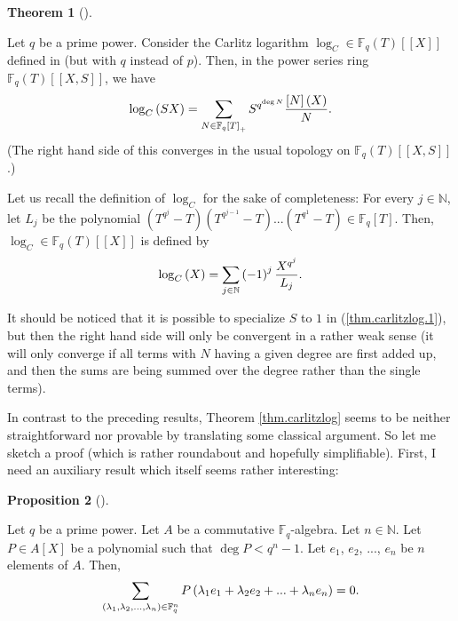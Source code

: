 \documentclass[numbers=enddot,12pt,final,onecolumn,notitlepage]{scrartcl}%
\theoremstyle{definition}
\newtheorem{theo}{Theorem}[section]
\newenvironment{theorem}[1][]
{\begin{theo}[#1]\begin{leftbar}}
{\end{leftbar}\end{theo}}
\newtheorem{prop}[theo]{Proposition}
\newenvironment{proposition}[1][]
{\begin{prop}[#1]\begin{leftbar}}
{\end{leftbar}\end{prop}}
\let\sumnonlimits\sum
\renewcommand{\sum}{\sumnonlimits\limits}
\begin{document}
\begin{theorem}
\label{thm.carlitzlog}Let $q$ be a prime power. Consider the Carlitz logarithm
$\log_{C}\in\mathbb{F}_{q}\left(  T\right)  \left[  \left[  X\right]  \right]
$ defined in \cite[Section 8]{kc-carlitz} (but with $q$ instead of $p$). Then,
in the power series ring $\mathbb{F}_{q}\left(  T\right)  \left[  \left[
X,S\right]  \right]  $, we have%
\begin{equation}
\log_{C}\left(  SX\right)  =\sum\limits_{N\in\mathbb{F}_{q}\left[  T\right]
_{+}}S^{q^{\deg N}}\dfrac{\left[  N\right]  \left(  X\right)  }{N}.
\label{thm.carlitzlog.1}%
\end{equation}
(The right hand side of this converges in the usual topology on $\mathbb{F}%
_{q}\left(  T\right)  \left[  \left[  X,S\right]  \right]  $.)
\end{theorem}

Let us recall the definition of $\log_{C}$ for the sake of completeness: For
every $j\in\mathbb{N}$, let $L_{j}$ be the polynomial $\left(  T^{q^{j}%
}-T\right)  \left(  T^{q^{j-1}}-T\right)  ...\left(  T^{q^{1}}-T\right)
\in\mathbb{F}_{q}\left[  T\right]  $. Then, $\log_{C}\in\mathbb{F}_{q}\left(
T\right)  \left[  \left[  X\right]  \right]  $ is defined by%
\begin{equation}
\log_{C}\left(  X\right)  =\sum\limits_{j\in\mathbb{N}}\left(  -1\right)
^{j}\dfrac{X^{q^{j}}}{L_{j}}. \label{carlitzlog}%
\end{equation}


It should be noticed that it is possible to specialize $S$ to $1$ in
(\ref{thm.carlitzlog.1}), but then the right hand side will only be convergent
in a rather weak sense (it will only converge if all terms with $N$ having a
given degree are first added up, and then the sums are being summed over the
degree rather than the single terms).

In contrast to the preceding results, Theorem \ref{thm.carlitzlog} seems to be
neither straightforward nor provable by translating some classical argument.
So let me sketch a proof (which is rather roundabout and hopefully
simplifiable). First, I need an auxiliary result which itself seems rather interesting:

\begin{proposition}
\label{prop.carlitzlog.lem}Let $q$ be a prime power. Let $A$ be a commutative
$\mathbb{F}_{q}$-algebra. Let $n\in\mathbb{N}$. Let $P\in A\left[  X\right]  $
be a polynomial such that $\deg P<q^{n}-1$. Let $e_{1}$, $e_{2}$, $...$,
$e_{n}$ be $n$ elements of $A$. Then,%
\[
\sum\limits_{\left(  \lambda_{1},\lambda_{2},...,\lambda_{n}\right)
\in\mathbb{F}_{q}^{n}}P\left(  \lambda_{1}e_{1}+\lambda_{2}e_{2}%
+...+\lambda_{n}e_{n}\right)  =0.
\]

\end{proposition}
\end{document}
